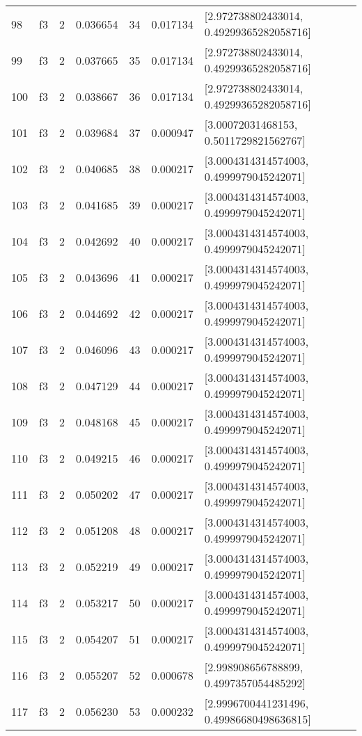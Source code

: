 \begin{tabular}{lllrlrl}
98  &  f3 &   2 &  0.036654 &   34 &  0.017134 &   [2.972738802433014, 0.49299365282058716] \\
99  &  f3 &   2 &  0.037665 &   35 &  0.017134 &   [2.972738802433014, 0.49299365282058716] \\
100 &  f3 &   2 &  0.038667 &   36 &  0.017134 &   [2.972738802433014, 0.49299365282058716] \\
101 &  f3 &   2 &  0.039684 &   37 &  0.000947 &     [3.00072031468153, 0.5011729821562767] \\
102 &  f3 &   2 &  0.040685 &   38 &  0.000217 &   [3.0004314314574003, 0.4999979045242071] \\
103 &  f3 &   2 &  0.041685 &   39 &  0.000217 &   [3.0004314314574003, 0.4999979045242071] \\
104 &  f3 &   2 &  0.042692 &   40 &  0.000217 &   [3.0004314314574003, 0.4999979045242071] \\
105 &  f3 &   2 &  0.043696 &   41 &  0.000217 &   [3.0004314314574003, 0.4999979045242071] \\
106 &  f3 &   2 &  0.044692 &   42 &  0.000217 &   [3.0004314314574003, 0.4999979045242071] \\
107 &  f3 &   2 &  0.046096 &   43 &  0.000217 &   [3.0004314314574003, 0.4999979045242071] \\
108 &  f3 &   2 &  0.047129 &   44 &  0.000217 &   [3.0004314314574003, 0.4999979045242071] \\
109 &  f3 &   2 &  0.048168 &   45 &  0.000217 &   [3.0004314314574003, 0.4999979045242071] \\
110 &  f3 &   2 &  0.049215 &   46 &  0.000217 &   [3.0004314314574003, 0.4999979045242071] \\
111 &  f3 &   2 &  0.050202 &   47 &  0.000217 &   [3.0004314314574003, 0.4999979045242071] \\
112 &  f3 &   2 &  0.051208 &   48 &  0.000217 &   [3.0004314314574003, 0.4999979045242071] \\
113 &  f3 &   2 &  0.052219 &   49 &  0.000217 &   [3.0004314314574003, 0.4999979045242071] \\
114 &  f3 &   2 &  0.053217 &   50 &  0.000217 &   [3.0004314314574003, 0.4999979045242071] \\
115 &  f3 &   2 &  0.054207 &   51 &  0.000217 &   [3.0004314314574003, 0.4999979045242071] \\
116 &  f3 &   2 &  0.055207 &   52 &  0.000678 &    [2.998908656788899, 0.4997357054485292] \\
117 &  f3 &   2 &  0.056230 &   53 &  0.000232 &  [2.9996700441231496, 0.49986680498636815] \\

\end{tabular}
